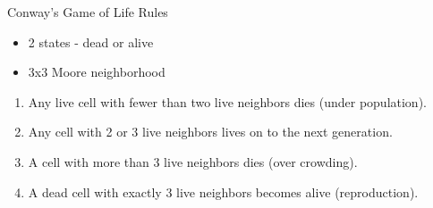 \documentclass[bigger]{beamer}
\begin{document}
\begin{frame}[label=sec-15]{Conway's Game of Life Rules}
\begin{itemize}
\item<1->2 states - dead or alive
\item<2->3x3 Moore neighborhood
\end{itemize}

\begin{enumerate}
\item<3->Any live cell with fewer than two live neighbors dies (under population).
\item<4->Any cell with 2 or 3 live neighbors lives on to the next generation.
\item<5->A cell with more than 3 live neighbors dies (over crowding).
\item<6->A dead cell with exactly 3 live neighbors becomes alive (reproduction).
\end{enumerate}
\end{frame}
\end{document}
